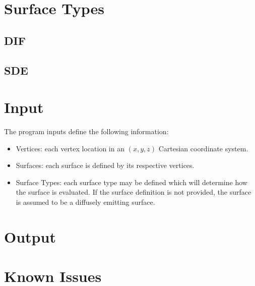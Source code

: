 \documentclass{article}
\begin{document}
\section{Surface Types}

\subsection{DIF}

\subsection{SDE}

\section{Input}
\label{sec:input}

The program inputs define the following information: 
\begin{itemize}
	\item Vertices: each vertex location in an $(x,y,z)$ Cartesian coordinate system.
	\item Surfaces: each surface is defined by its respective vertices.
	\item Surface Types: each surface type may be defined which will determine how the surface is evaluated. If the surface definition is not provided, the surface is assumed to be a diffusely emitting surface.
\end{itemize}

\section{Output}

\section{Known Issues}

\newpage
\renewcommand\bibname{References}

\end{document}
